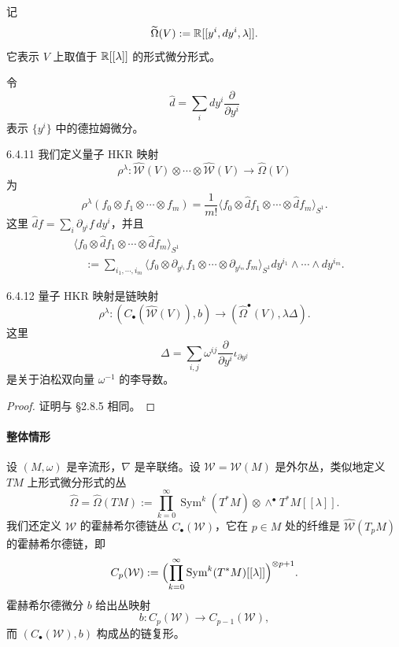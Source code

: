 记
\[
\widetilde\Omega(V):=\mathbb{R}[[y^i,dy^i,\lambda]].
\]
它表示 $V$ 上取值于 $\mathbb{R}[[\lambda]]$ 的形式微分形式。

令
\[
\widehat d=\sum_i dy^i\frac{\partial}{\partial y^i}
\]
表示 $\{y^i\}$ 中的德拉姆微分。

\begin{definition}{6.4.11}
  我们定义量子 HKR 映射
  \[
  \rho^\lambda:\widehat{\mathcal W}(V)\otimes\cdots\otimes\widehat{\mathcal W}(V)
  \longrightarrow\widehat\Omega(V)
  \]
  为
  \[
  \rho^\lambda(f_0\otimes f_1\otimes\cdots\otimes f_m)
  =\frac{1}{m!}
  \bigl\langle f_0\otimes\widehat df_1\otimes\cdots\otimes\widehat df_m
  \bigr\rangle_{S^1}.
  \]
  这里 $\widehat df=\sum_i\partial_{y^i}f\,dy^i$，并且
  \begin{align*}
  &\bigl\langle f_0\otimes\widehat df_1\otimes\cdots\otimes\widehat df_m
  \bigr\rangle_{S^1}\\
  &\quad:=\sum_{i_1,\cdots,i_m}
  \bigl\langle f_0\otimes\partial_{y^{i_1}}f_1\otimes\cdots
  \otimes\partial_{y^{i_m}}f_m\bigr\rangle_{S^1}
  dy^{i_1}\wedge\cdots\wedge dy^{i_m}.
  \end{align*}
\end{definition}

\begin{proposition}{6.4.12}
  量子 HKR 映射是链映射
  \[
  \rho^\lambda:(C_\bullet(\widehat{\mathcal W}(V)),b)
  \longrightarrow(\widehat\Omega^\bullet(V),\lambda\Delta).
  \]
  这里
  \[
  \Delta=\sum_{i,j}\omega^{ij}\frac{\partial}{\partial y^i}
  \iota_{\partial y^j}
  \]
  是关于泊松双向量 $\omega^{-1}$ 的李导数。
\end{proposition}

\begin{proof}
  证明与 §2.8.5 相同。
\end{proof}

\paragraph{整体情形}\par

设 $(M,\omega)$ 是辛流形，$\nabla$ 是辛联络。设 $\mathcal W=\mathcal W(M)$ 是外尔丛，类似地定义 $TM$ 上形式微分形式的丛
\[
\widehat\Omega=\widehat\Omega(TM)
:=\prod_{k=0}^{\infty}\operatorname{Sym}^k(T^*M)
\otimes\wedge^\bullet T^*M[[\lambda]].
\]
我们还定义 $\mathcal W$ 的霍赫希尔德链丛 $C_\bullet(\mathcal W)$，它在 $p\in M$ 处的纤维是 $\widehat{\mathcal W}(T_pM)$ 的霍赫希尔德链，即
\[
C_p(\mathcal W):=
\Bigl(\prod_{k=0}^{\infty}\operatorname{Sym}^k(T^*M)[[\lambda]]\Bigr)^{\otimes p+1}.
\]
霍赫希尔德微分 $b$ 给出丛映射
\[
b:C_p(\mathcal W)\longrightarrow C_{p-1}(\mathcal W),
\]
而 $(C_\bullet(\mathcal W),b)$ 构成丛的链复形。

